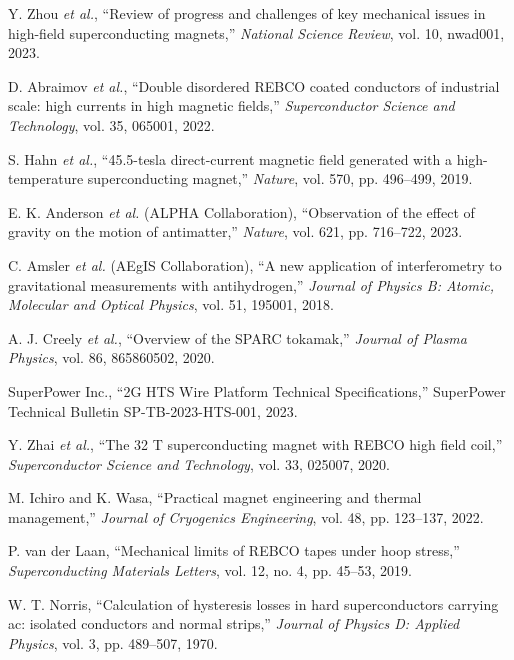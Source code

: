 \documentclass[10pt,twocolumn]{article}
\begin{document}
\begin{thebibliography}{8}

Y. Zhou \emph{et al.}, ``Review of progress and challenges of key mechanical issues in high-field superconducting magnets,'' \textit{National Science Review}, vol. 10, nwad001, 2023.

D. Abraimov \emph{et al.}, ``Double disordered REBCO coated conductors of industrial scale: high currents in high magnetic fields,'' \textit{Superconductor Science and Technology}, vol. 35, 065001, 2022.

S. Hahn \emph{et al.}, ``45.5-tesla direct-current magnetic field generated with a high-temperature superconducting magnet,'' \textit{Nature}, vol. 570, pp. 496--499, 2019.

E. K. Anderson \emph{et al.} (ALPHA Collaboration), ``Observation of the effect of gravity on the motion of antimatter,'' \textit{Nature}, vol. 621, pp. 716--722, 2023.

C. Amsler \emph{et al.} (AEgIS Collaboration), ``A new application of interferometry to gravitational measurements with antihydrogen,'' \textit{Journal of Physics B: Atomic, Molecular and Optical Physics}, vol. 51, 195001, 2018.

A. J. Creely \emph{et al.}, ``Overview of the SPARC tokamak,'' \textit{Journal of Plasma Physics}, vol. 86, 865860502, 2020.

SuperPower Inc., ``2G HTS Wire Platform Technical Specifications,'' SuperPower Technical Bulletin SP-TB-2023-HTS-001, 2023.

Y. Zhai \emph{et al.}, ``The 32 T superconducting magnet with REBCO high field coil,'' \textit{Superconductor Science and Technology}, vol. 33, 025007, 2020.

M. Ichiro and K. Wasa, ``Practical magnet engineering and thermal management,'' \textit{Journal of Cryogenics Engineering}, vol. 48, pp. 123--137, 2022.

P. van der Laan, ``Mechanical limits of REBCO tapes under hoop stress,'' \textit{Superconducting Materials Letters}, vol. 12, no. 4, pp. 45--53, 2019.

W. T. Norris, ``Calculation of hysteresis losses in hard superconductors carrying ac: isolated conductors and normal strips,'' \textit{Journal of Physics D: Applied Physics}, vol. 3, pp. 489--507, 1970.


\end{thebibliography}
\end{document}
